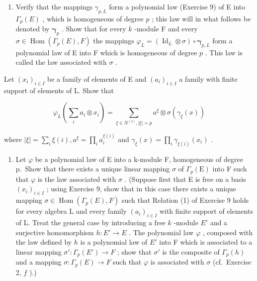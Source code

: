 \begin{enumerate}
\def\labelenumi{\alph{enumi})}
\tightlist
\item
  Verify that the mappings \(\gamma_{p,L}\) form a polynomial law (Exercise 9) of E into \(\Gamma_p(E)\) , which is homogeneous of degree \(p\) ; this law will in what follows be denoted by \(\boldsymbol{\gamma}_p\) . Show that for every \(k\) -module F and every \(\sigma \in \operatorname{Hom}(\Gamma_p(E), F)\) the mappings \(\varphi_L = (\operatorname{Id}_L \otimes \sigma) \circ \boldsymbol{\gamma}_{p,L}\) form a polynomial law of E into F which is homogeneous of degree \(p\) . This law is called the law associated with \(\sigma\) .
\end{enumerate}

Let \((x_{i})_{i\in I}\) be a family of elements of E and \((a_{i})_{i\in I}\) a family with finite support of elements of L. Show that

\[
\varphi_ {L} \left(\sum_ {i} a _ {i} \otimes x _ {i}\right) = \sum_ {\xi \in N ^ {(I)}, | \xi | = p} a ^ {\xi} \otimes \sigma (\gamma_ {\xi} (x))
\]

where \(|\xi| = \sum_{i} \xi(i), a^{\xi} = \prod_{i} a_{i}^{\xi(i)}\) and \(\gamma_{\xi}(x) = \prod_{i} \gamma_{\xi(i)}(x_{i})\) .

\begin{enumerate}
\def\labelenumi{\alph{enumi})}
\setcounter{enumi}{1}
\tightlist
\item
  Let \(\varphi\) be a polynomial law of E into a k-module F, homogeneous of degree p.~Show that there exists a unique linear mapping \(\sigma\) of \(\Gamma_{p}(\mathrm{E})\) into F such that \(\varphi\) is the law associated with \(\sigma\) . (Suppose first that E is free on a basis \((x_i)_{i \in I}\) ; using Exercise 9, show that in this case there exists a unique mapping \(\sigma \in \operatorname{Hom}(\Gamma_p(E), F)\) such that Relation (1) of Exercise 9 holds for every algebra L and every family \((a_i)_{i \in I}\) with finite support of elements of L. Treat the general case by introducing a free \(k\) -module \(E'\) and a surjective homomorphism \(h: E' \to E\) . The polynomial law \(\varphi\) , composed with the law defined by \(h\) is a polynomial law of \(E'\) into F which is associated to a linear mapping \(\sigma': \Gamma_p(E') \to F\) ; show that \(\sigma'\) is the composite of \(\Gamma_p(h)\) and a mapping \(\sigma: \Gamma_p(E) \to F\) such that \(\varphi\) is associated with \(\sigma\) (cf.~Exercise 2, \(f\) ).)
\end{enumerate}

